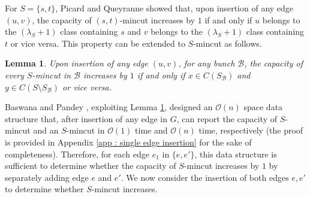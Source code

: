 \documentclass[letterpaper,11pt]{article}
\newtheorem{lemma}{Lemma}[]
\begin{document}
For $S=\{s,t\}$, Picard and Queyranne \cite{DBLP:journals/mp/PicardQ80} showed that, upon insertion of any edge $(u,v)$, the capacity of $(s,t)$-mincut increases by $1$ if and only if $u$ belongs to the $(\lambda_S+1)$ class containing $s$ and $v$ belongs to the $(\lambda_S+1)$ class containing $t$ or vice versa. This property can be extended to $S$-mincut as follows.  \begin{lemma} \label{lem : $S$-mincuts of a bunch increases}
    Upon insertion of any edge $(u,v)$, for any bunch ${\mathcal B}$, the capacity of every $S$-mincut in  ${\mathcal B}$ increases by $1$ if and only if $x\in C(S_{\mathcal B})$ and $y\in C(S\setminus S_{\mathcal B})$ or vice versa.
\end{lemma}
Baswana and Pandey \cite{DBLP:conf/soda/BaswanaP22}, exploiting Lemma \ref{lem : $S$-mincuts of a bunch increases}, designed an ${\mathcal O}(n)$ space data structure that, after insertion of any edge in $G$, can report  the capacity of $S$-mincut and an $S$-mincut in ${\mathcal O}(1)$ time and ${\mathcal O}(n)$ time, respectively (the proof is provided in Appendix \ref{app : single edge insertion} for the sake of completeness). Therefore, for each edge $e_1$ in $\{e,e'\}$, this data structure is sufficient to determine whether the capacity of $S$-mincut increases by $1$ by separately adding edge $e$ and $e'$. We now consider the insertion of both edges $e,e'$ to determine whether $S$-mincut increases.
\end{document}
